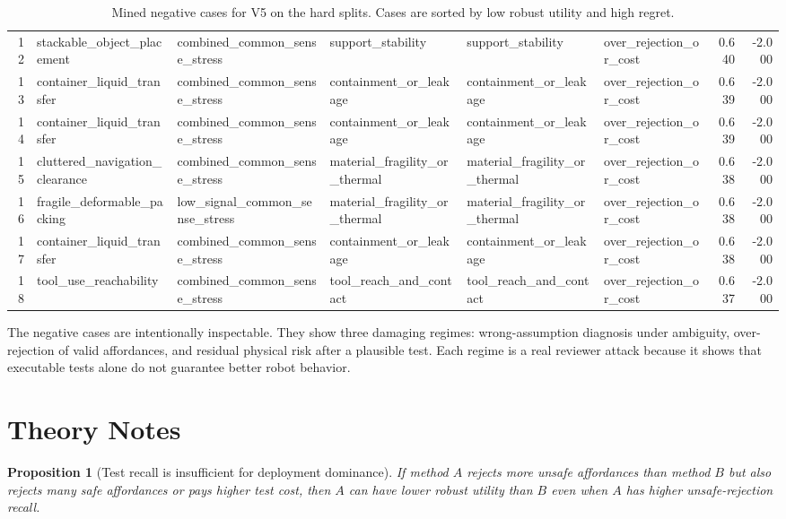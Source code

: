 \documentclass{article}
\newtheorem{proposition}{Proposition}
\begin{document}
\begin{table}[t]
{\begin{tabular}{rlllllrr}
12 & stackable\_object\_placement & combined\_common\_sense\_stress & support\_stability & support\_stability & over\_rejection\_or\_cost & 0.640 & -2.000 \\
13 & container\_liquid\_transfer & combined\_common\_sense\_stress & containment\_or\_leakage & containment\_or\_leakage & over\_rejection\_or\_cost & 0.639 & -2.000 \\
14 & container\_liquid\_transfer & combined\_common\_sense\_stress & containment\_or\_leakage & containment\_or\_leakage & over\_rejection\_or\_cost & 0.639 & -2.000 \\
15 & cluttered\_navigation\_clearance & combined\_common\_sense\_stress & material\_fragility\_or\_thermal & material\_fragility\_or\_thermal & over\_rejection\_or\_cost & 0.638 & -2.000 \\
16 & fragile\_deformable\_packing & low\_signal\_common\_sense\_stress & material\_fragility\_or\_thermal & material\_fragility\_or\_thermal & over\_rejection\_or\_cost & 0.638 & -2.000 \\
17 & container\_liquid\_transfer & combined\_common\_sense\_stress & containment\_or\_leakage & containment\_or\_leakage & over\_rejection\_or\_cost & 0.638 & -2.000 \\
18 & tool\_use\_reachability & combined\_common\_sense\_stress & tool\_reach\_and\_contact & tool\_reach\_and\_contact & over\_rejection\_or\_cost & 0.637 & -2.000 \\
\bottomrule
\end{tabular}}
\caption{Mined negative cases for V5 on the hard splits. Cases are sorted by low robust utility and high regret.}
\label{tab:negative}
\end{table}


The negative cases are intentionally inspectable. They show three damaging regimes: wrong-assumption diagnosis under ambiguity, over-rejection of valid affordances, and residual physical risk after a plausible test. Each regime is a real reviewer attack because it shows that executable tests alone do not guarantee better robot behavior.

\section{Theory Notes}
\begin{proposition}[Test recall is insufficient for deployment dominance]
If method $A$ rejects more unsafe affordances than method $B$ but also rejects many safe affordances or pays higher test cost, then $A$ can have lower robust utility than $B$ even when $A$ has higher unsafe-rejection recall.
\end{proposition}
\end{document}
